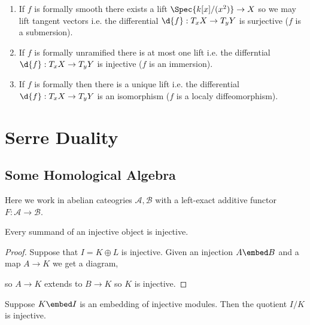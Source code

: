 \documentclass[12pt]{article}
\begin{document}
\begin{enumerate}
\item If $f$ is formally smooth there exists a lift $\Spec{k[x]/(x^2)} \to X$ so we may lift tangent vectors i.e. the differential $\d{f} : T_x X \to T_y Y$ is surjective ($f$ is a submersion).

\item If $f$ is formally unramified there is at most one lift i.e. the differntial $\d{f} : T_x X \to T_y Y$ is injective ($f$ is an immersion).

\item If $f$ is formally \etale then there is a unique lift i.e. the differential $\d{f} : T_x X \to T_y Y$ is an isomorphism ($f$ is a localy diffeomorphism). 
\end{enumerate}

\section{Serre Duality}

\subsection{Some Homological Algebra}

\begin{rmk}
Here we work in abelian cateogries $\mathcal{A}, \mathcal{B}$ with a left-exact additive functor $F : \mathcal{A} \to \mathcal{B}$.
\end{rmk}

\begin{lemma}
Every summand of an injective object is injective. 
\end{lemma}

\begin{proof}
Suppose that $I = K \oplus L$ is injective. Given an injection $A \embed B$ and a map $A \to K$ we get a diagram,
\begin{center}
\end{center}
so $A \to K$ extends to $B \to K$ so $K$ is injective.
\end{proof}

\begin{cor}
Suppose $K \embed I$ is an embedding of injective modules. Then the quotient $I/K$ is injective.
\end{cor}
\end{document}
